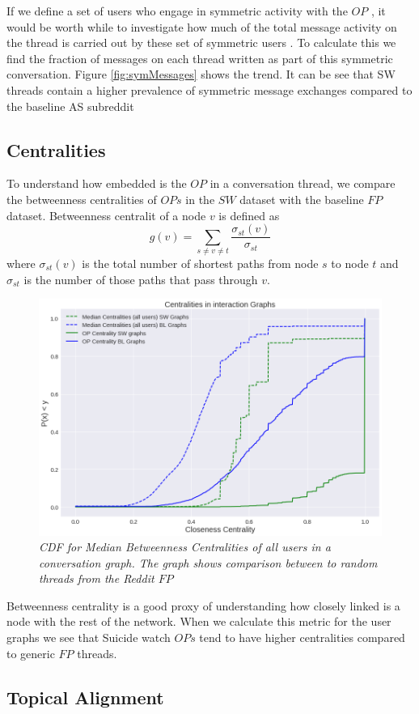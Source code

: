 If we define a set of users who engage in symmetric activity with the $OP$ , it would be worth while to investigate how much of the total message activity on the thread is carried out by these set of symmetric users . To calculate this we find the fraction of messages on each thread written as part of this symmetric conversation. Figure \ref{fig:symMessages} shows the trend. It can be see that SW threads contain a higher prevalence of symmetric message exchanges compared to the baseline AS subreddit 

\subsection{Centralities}
To understand how embedded is the $OP$ in a conversation thread, we compare the betweenness centralities of $OPs$ in the $SW$ dataset with the baseline $FP$ dataset. 
Betweenness centralit of a node $v$ is defined as 
\begin{equation}
	g(v) = \sum_{s \neq v \neq t}\frac{\sigma_{st}(v)}{\sigma_{st}}
\end{equation}
where $\sigma_{st}(v)$ is the total number of shortest paths from node $s$ to node $t$ and $\sigma_{st}$ is the number of those paths that pass through $v$.


\begin{figure}[!h]
	\centering
	\includegraphics[width=0.5\columnwidth]{Figures/AllCentralities.png}
	\caption{\textsl{ CDF for Median Betweenness Centralities of all users in a conversation graph. The graph shows comparison between  to random threads from the Reddit $FP$ }}
	\label{fig:AllCentralities}
\end{figure}


Betweenness centrality is a good proxy of understanding how closely linked is a node with the rest of the network. When we calculate this metric for the user graphs we see that Suicide watch $OPs$ tend to have higher centralities compared to generic $FP$ threads. 


\subsection{Topical Alignment}

